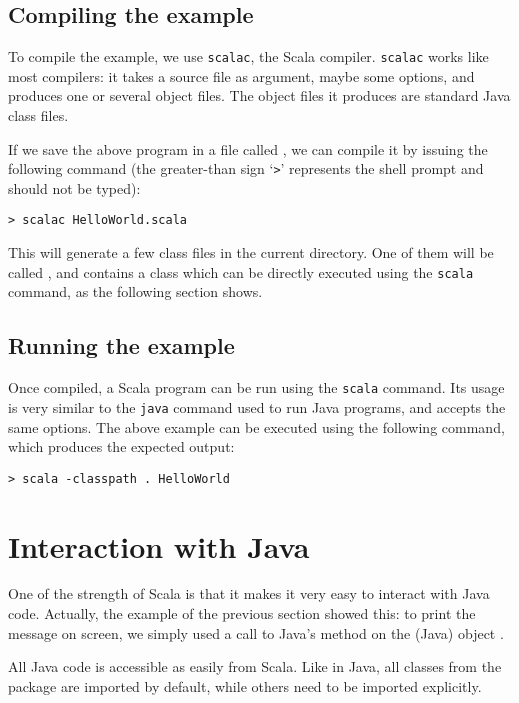 \documentclass[a4paper,12pt,twoside,titlepage]{article}
\newcommand{\langname}[1]{#1\xspace}
\newcommand{\Scala}{\langname{Scala}}
\newcommand{\Java}{\langname{Java}}
\newcommand{\toolname}[1]{\texttt{#1}\xspace}
\newcommand{\scalac}{\toolname{scalac}}
\newcommand{\scala}{\toolname{scala}}
\newcommand{\java}{\toolname{java}}
\begin{document}
\subsection{Compiling the example}
\label{sec:compiling-example}

To compile the example, we use \scalac, the \Scala compiler. \scalac
works like most compilers: it takes a source file as argument, maybe
some options, and produces one or several object files. The object
files it produces are standard \Java class files.

If we save the above program in a file called
, we can compile it by issuing the following
command (the greater-than sign `\verb|>|' represents the shell prompt
and should not be typed):
\begin{verbatim}
> scalac HelloWorld.scala
\end{verbatim}
This will generate a few class files in the current directory. One of
them will be called , and contains a class
which can be directly executed using the \scala command, as the
following section shows.

\subsection{Running the example}
\label{sec:running-example}

Once compiled, a \Scala program can be run using the \scala command.
Its usage is very similar to the \java command used to run \Java
programs, and accepts the same options. The above example can be
executed using the following command, which produces the expected
output:
\begin{verbatim}
> scala -classpath . HelloWorld
\end{verbatim}

\section{Interaction with Java}
\label{sec:inter-with-java}

One of the strength of \Scala is that it makes it very easy to
interact with \Java code. Actually, the example of the previous
section showed this: to print the message on screen, we simply used a
call to \Java's  method on the (\Java) object
.

All \Java code is accessible as easily from \Scala. Like in \Java, all
classes from the  package are imported by default,
while others need to be imported explicitly.
\end{document}

